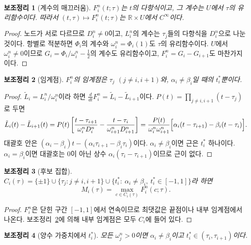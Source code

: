 \documentclass[11pt,a4paper]{article}
\newtheorem{lemma}{보조정리}
\theoremstyle{definition}
\theoremstyle{remark}
\newcommand{\R}{\mathbb{R}}
\begin{document}
\begin{lemma}[계수의 매끄러움]\label{lem:smooth}
$F_i^n(t;\tau)$는 $t$의 다항식이고, 그 계수는 $U$에서 $\tau$의 유리함수이다.
따라서 $(t,\tau)\mapsto F_i^n(t;\tau)$는 $\R\times U$에서 $C^\infty$이다.
\end{lemma}

\begin{proof}
노드가 서로 다르므로 $D_i^n\ne0$이고, $L_i^n$의 계수는 $\tau_j$들의 다항식을 $D_i^n$으로 나눈 것이다.
항별로 적분하면 $\Phi_i$의 계수와 $\omega_i^n=\Phi_i(1)$도 $\tau$의 유리함수이다.
$U$에서 $\omega_i^n\ne0$이므로 $G_i=\Phi_i/\omega_i^n-\tfrac12$의 계수도 유리함수이고, $F_i^n=G_i-G_{i+1}$도 마찬가지이다.
\end{proof}

\begin{lemma}[임계점]\label{lem:critical}
$F_i^n$의 임계점은 $\tau_j$ $(j\ne i,i+1)$와, $\alpha_i\ne\beta_i$일 때의 $t^*_i$뿐이다.
\end{lemma}

\begin{proof}
$\tilde L_i=L_i^n/\omega_i^n$이라 하면 $\frac{d}{dt}F_i^n=\tilde L_i-\tilde L_{i+1}$이다.
$P(t)=\prod_{j\ne i,i+1}(t-\tau_j)$로 두면
\[
\tilde L_i(t)-\tilde L_{i+1}(t)
=P(t)\left[\frac{t-\tau_{i+1}}{\omega_i^nD_i^n}-\frac{t-\tau_i}{\omega_{i+1}^nD_{i+1}^n}\right]
=\frac{P(t)}{\omega_i^n\omega_{i+1}^n}\Bigl[\alpha_i(t-\tau_{i+1})-\beta_i(t-\tau_i)\Bigr].
\]
대괄호 안은 $(\alpha_i-\beta_i)t-(\alpha_i\tau_{i+1}-\beta_i\tau_i)$이다.
$\alpha_i\ne\beta_i$이면 근은 $t^*_i$ 하나이다.
$\alpha_i=\beta_i$이면 대괄호는 0이 아닌 상수 $\alpha_i(\tau_i-\tau_{i+1})$이므로 근이 없다.
\end{proof}

\begin{lemma}[후보 집합]\label{lem:candidates}
$C_i(\tau)=\{\pm1\}\cup\{\tau_j: j\ne i,i+1\}\cup\{t^*_i:\ \alpha_i\ne\beta_i,\ t^*_i\in[-1,1]\}$라 하면
\[
M_i(\tau)=\max_{c\in C_i(\tau)}F_i^n(c;\tau).
\]
\end{lemma}

\begin{proof}
$F_i^n$은 닫힌 구간 $[-1,1]$에서 연속이므로 최댓값은 끝점이나 내부 임계점에서 나온다.
보조정리~\ref{lem:critical}에 의해 내부 임계점은 모두 $C_i$에 들어 있다.
\end{proof}

\begin{lemma}[양수 가중치에서 $t^*_i$]\label{lem:positive}
모든 $\omega_j^n>0$이면 $\alpha_i\ne\beta_i$이고 $t^*_i\in(\tau_i,\tau_{i+1})$이다.
\end{lemma}
\end{document}
